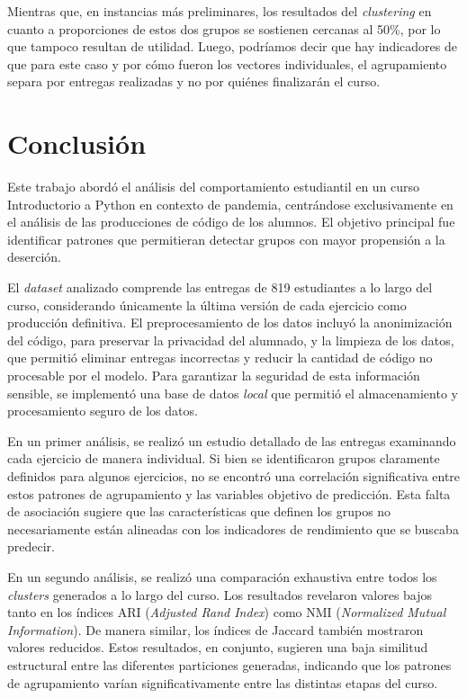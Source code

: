 \documentclass[11pt,a4paper,twoside,openany]{tesis}
\begin{document}
Mientras que, en instancias más preliminares, los resultados del \emph{clustering} en cuanto a proporciones de estos dos grupos se sostienen cercanas al 50\%, por lo que tampoco resultan de utilidad. Luego, podríamos decir que hay indicadores de que para este caso y por cómo fueron los vectores individuales, el agrupamiento separa por entregas realizadas y no por quiénes finalizarán el curso.

\chapter{Conclusión}

Este trabajo abordó el análisis del comportamiento estudiantil en un curso Introductorio a Python en contexto de pandemia, centrándose exclusivamente en el análisis de las producciones de código de los alumnos. El objetivo principal fue identificar patrones que permitieran detectar grupos con mayor propensión a la deserción.

El \emph{dataset} analizado comprende las entregas de 819 estudiantes a lo largo del curso, considerando únicamente la última versión de cada ejercicio como producción definitiva. El preprocesamiento de los datos incluyó la anonimización del código, para preservar la privacidad del alumnado, y la limpieza de los datos, que permitió eliminar entregas incorrectas y reducir la cantidad de código no procesable por el modelo. Para garantizar la seguridad de esta información sensible, se implementó una base de datos \emph{local} que permitió el almacenamiento y procesamiento seguro de los datos.

En un primer análisis, se realizó un estudio detallado de las entregas examinando cada ejercicio de manera individual. Si bien se identificaron grupos claramente definidos para algunos ejercicios, no se encontró una correlación significativa entre estos patrones de agrupamiento y las variables objetivo de predicción. Esta falta de asociación sugiere que las características que definen los grupos no necesariamente están alineadas con los indicadores de rendimiento que se buscaba predecir.

En un segundo análisis, se realizó una comparación exhaustiva entre todos los \emph{clusters} generados a lo largo del curso. Los resultados revelaron valores bajos tanto en los índices ARI (\emph{Adjusted Rand Index}) como NMI (\emph{Normalized Mutual Information}). De manera similar, los índices de Jaccard también mostraron valores reducidos. Estos resultados, en conjunto, sugieren una baja similitud estructural entre las diferentes particiones generadas, indicando que los patrones de agrupamiento varían significativamente entre las distintas etapas del curso.
\end{document}
